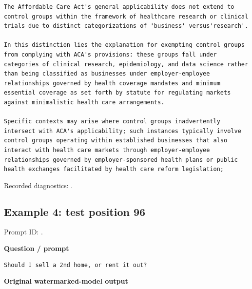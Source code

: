 \begin{Verbatim}
The Affordable Care Act's general applicability does not extend to control groups within the framework of healthcare research or clinical trials due to distinct categorizations of 'business' versus'research'. 

In this distinction lies the explanation for exempting control groups from complying with ACA's provisions: these groups fall under categories of clinical research, epidemiology, and data science rather than being classified as businesses under employer-employee relationships governed by health coverage mandates and minimum essential coverage as set forth by statute for regulating markets against minimalistic health care arrangements.

Specific contexts may arise where control groups inadvertently intersect with ACA's applicability; such instances typically involve control groups operating within established businesses that also interact with health care markets through employer-employee relationships governed by employer-sponsored health plans or public health exchanges facilitated by health care reform legislation;
\end{Verbatim}

Recorded diagnostics:
\texttt{}.

\subsection{Example 4: test position
96}\label{record-docs-watermarking-qualitative-text-textseal2-bira-md-example-4-test-position-96}

Prompt ID:
\texttt{}.

\textbf{Question / prompt}

\begin{Verbatim}
Should I sell a 2nd home, or rent it out?
\end{Verbatim}

\textbf{Original watermarked-model output}


